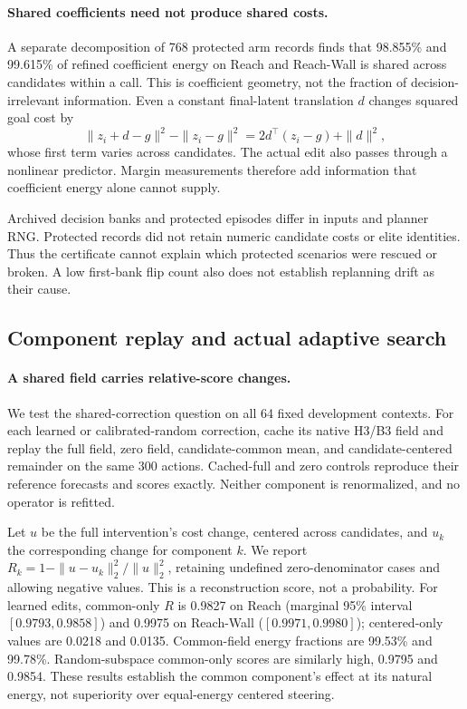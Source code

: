 \documentclass{article}
\begin{document}
\paragraph{Shared coefficients need not produce shared costs.}
A separate decomposition of 768 protected arm records finds that 98.855\% and 99.615\% of refined coefficient energy on Reach and Reach-Wall is shared across candidates within a call. This is coefficient geometry, not the fraction of decision-irrelevant information. Even a constant final-latent translation \(d\) changes squared goal cost by
\begin{equation}
 \|z_i+d-g\|^2-\|z_i-g\|^2
 =2d^\top(z_i-g)+\|d\|^2,
 \label{eq:translation}
\end{equation}
whose first term varies across candidates. The actual edit also passes through a nonlinear predictor. Margin measurements therefore add information that coefficient energy alone cannot supply.

Archived decision banks and protected episodes differ in inputs and planner RNG. Protected records did not retain numeric candidate costs or elite identities. Thus the certificate cannot explain which protected scenarios were rescued or broken. A low first-bank flip count also does not establish replanning drift as their cause.

\subsection{Component replay and actual adaptive search}
\label{sec:replay}

\paragraph{A shared field carries relative-score changes.}
We test the shared-correction question on all 64 fixed development contexts. For each learned or calibrated-random correction, cache its native H3/B3 field and replay the full field, zero field, candidate-common mean, and candidate-centered remainder on the same 300 actions. Cached-full and zero controls reproduce their reference forecasts and scores exactly. Neither component is renormalized, and no operator is refitted.

Let $u$ be the full intervention's cost change, centered across candidates, and $u_k$ the corresponding change for component $k$. We report $R_k=1-\|u-u_k\|_2^2/\|u\|_2^2$, retaining undefined zero-denominator cases and allowing negative values. This is a reconstruction score, not a probability. For learned edits, common-only $R$ is 0.9827 on Reach (marginal 95\% interval $[0.9793,0.9858]$) and 0.9975 on Reach-Wall ($[0.9971,0.9980]$); centered-only values are 0.0218 and 0.0135. Common-field energy fractions are 99.53\% and 99.78\%. Random-subspace common-only scores are similarly high, 0.9795 and 0.9854. These results establish the common component's effect at its natural energy, not superiority over equal-energy centered steering.
\end{document}
